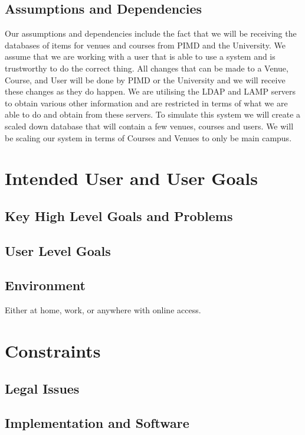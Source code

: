 \documentclass[12pt]{article}
\begin{document}
\subsection{Assumptions and Dependencies}
Our assumptions and dependencies include the fact that we will be receiving the databases of items for venues and courses from PIMD and the University. We assume that we are working with a user that is able to use a system and is trustworthy to do the correct thing. All changes that can be made to a Venue, Course, and User will be done by PIMD or the University and we will receive these changes as they do happen. We are utilising the LDAP and LAMP servers to obtain various other information and are restricted in terms of what we are able to do and obtain from these servers. To simulate this system we will create a scaled down database that will contain a few venues, courses and users. We will be scaling our system in terms of Courses and Venues to only be main campus.


\section{Intended User and User Goals}
\subsection{Key High Level Goals and Problems}

\subsection{User Level Goals}

\subsection{Environment}
Either at home, work, or anywhere with online access.

\section{Constraints}
\subsection{Legal Issues}

\subsection{Implementation and Software}
\end{document}
